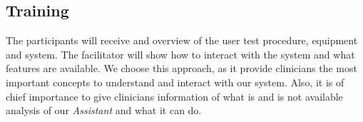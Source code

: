 \subsection{Training}

The participants will receive and overview of the user test procedure, equipment and system. The facilitator will show how to interact with the system and what features are available. We choose this approach, as it provide clinicians the most important concepts to understand and interact with our system. Also, it is of chief importance to give clinicians information of what is and is not available analysis of our \textit{Assistant} and what it can do.


\clearpage